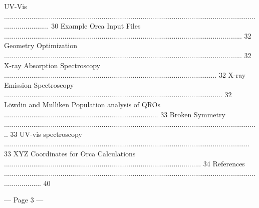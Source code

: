 UV-Vis ........................................................................................................................................................ 30 
Example Orca Input Files .......................................................................................................................... 32 
Geometry Optimization .......................................................................................................................... 32 
X-ray Absorption Spectroscopy ............................................................................................................. 32 
X-ray Emission Spectroscopy ................................................................................................................ 32 
Löwdin and Mulliken Population analysis of QROs ............................................................................... 33 
Broken Symmetry ................................................................................................................................... 33 
UV-vis spectroscopy .............................................................................................................................. 33 
XYZ Coordinates for Orca Calculations ..................................................................................................... 34 
References .................................................................................................................................................... 40 
 
 
 


--- Page 3 ---
 
